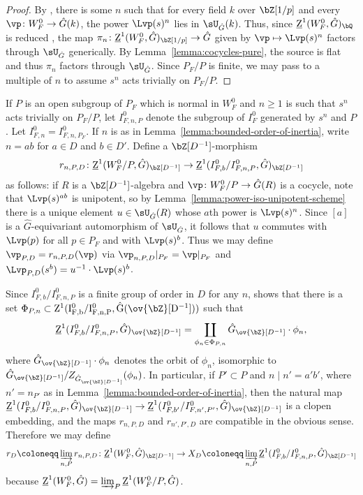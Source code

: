 \begin{proof}
    By \cite[2.2]{DHKM}, there is some $n$ such that for every field $k$ over $\bZ[1/p]$ and every $\vp\colon W_F^0 \to \hat{G}(k)$, the power $\Lvp(s)^n$ lies in $\sU_{\hat{G}}(k)$. Thus, since $\underline{\rm{Z}}^1(W_F^0, \hat{G})_{\bQ}$ is reduced \cite[4.1]{DHKM}, the map $\pi_n\colon \underline{\rm{Z}}^1(W_F^0, \hat{G})_{\bZ[1/p]} \to \hat{G}$ given by $\vp \mapsto \Lvp(s)^n$ factors through $\sU_{\hat{G}}$ generically. By Lemma~\ref{lemma:cocycles-pure}, the source is flat and thus $\pi_n$ factors through $\sU_{\hat{G}}$. Since $P_F/P$ is finite, we may pass to a multiple of $n$ to assume $s^n$ acts trivially on $P_F/P$.
\end{proof}

If $P$ is an open subgroup of $P_F$ which is normal in $W_F^0$ and $n \geq 1$ is such that $s^n$ acts trivially on $P_F/P$, let $I_{F, n, P}^0$ denote the subgroup of $I_F^0$ generated by $s^n$ and $P$. Let $I_{F, n}^0 = I_{F, n, P_F}^0$. If $n$ is as in Lemma~\ref{lemma:bounded-order-of-inertia}, write $n = ab$ for $a \in D$ and $b \in D'$. Define a $\bZ[D^{-1}]$-morphism 
\[
r_{n, P, D}\colon \underline{\rm{Z}}^1(W_F^0/P, \hat{G})_{\bZ[D^{-1}]} \to \underline{\rm{Z}}^1(I_{F, b}^0/I_{F, n, P}^0, \hat{G})_{\bZ[D^{-1}]}
\]
as follows: if $R$ is a $\bZ[D^{-1}]$-algebra and $\vp\colon W_F^0/P \to \hat{G}(R)$ is a cocycle, note that $\Lvp(s)^{ab}$ is unipotent, so by Lemma~\ref{lemma:power-iso-unipotent-scheme} there is a unique element $u \in \sU_{\hat{G}}(R)$ whose $a$th power is $\Lvp(s)^n$. Since $[a]$ is a $\hat{G}$-equivariant automorphism of $\sU_{\hat{G}}$, it follows that $u$ commutes with $\Lvp(p)$ for all $p \in P_F$ and with $\Lvp(s)^b$. Thus we may define $\vp_{P, D} = r_{n, P, D}(\vp)$ via $\vp_{n, P, D}|_{P_F} = \vp|_{P_F}$ and $\Lvp_{P, D}(s^b) = u^{-1} \cdot \Lvp(s)^b$.\smallskip

Since $I_{F, b}^0/I_{F, n, P}^0$ is a finite group of order in $D$ for any $n$, \cite[A.9]{DHKM} shows that there is a set $\Phi_{P, n} \subset \rm{Z}^1(I_{F, b}^0/I_{F, n, P}^0, \hat{G}(\ov{\bZ}[D^{-1}]))$ such that
\[
\underline{\rm{Z}}^1(I_{F, b}^0/I_{F, n, P}^0, \hat{G})_{\ov{\bZ}[D^{-1}]} = \coprod_{\phi_n \in \Phi_{P, n}} \hat{G}_{\ov{\bZ}[D^{-1}]} \cdot \phi_n,
\]
where $\hat{G}_{\ov{\bZ}[D^{-1}]} \cdot \phi_n$ denotes the orbit of $\phi_n$, isomorphic to $\hat{G}_{\ov{\bZ}[D^{-1}]}/Z_{\hat{G}_{\ov{\bZ}[D^{-1}]}}(\phi_n)$. In particular, if $P' \subset P$ and $n \mid n' = a'b'$, where $n' = n_{P'}$ as in Lemma~\ref{lemma:bounded-order-of-inertia}, then the natural map $\underline{\rm{Z}}^1(I_{F, b}^0/I_{F, n, P}^0, \hat{G})_{\ov{\bZ}[D^{-1}]} \to \underline{\rm{Z}}^1(I_{F, b'}^0/I_{F, n', P'}^0, \hat{G})_{\ov{\bZ}[D^{-1}]}$ is a clopen embedding, and the maps $r_{n, P, D}$ and $r_{n', P', D}$ are compatible in the obvious sense. Therefore we may define
\[
r_D \coloneqq \varinjlim_{n, P} r_{n, P, D} \colon \underline{\rm{Z}}^1(W_F^0, \hat{G})_{\bZ[D^{-1}]} \to X_D \coloneqq \varinjlim_{n, P} \underline{\rm{Z}}^1(I_{F, b}^0/I_{F, n, P}^0, \hat{G})_{\bZ[D^{-1}]}
\]
because $\underline{\rm{Z}}^1(W_F^0, \hat{G}) = \varinjlim_P \underline{\rm{Z}}^1(W_F^0/P, \hat{G})$.\smallskip


